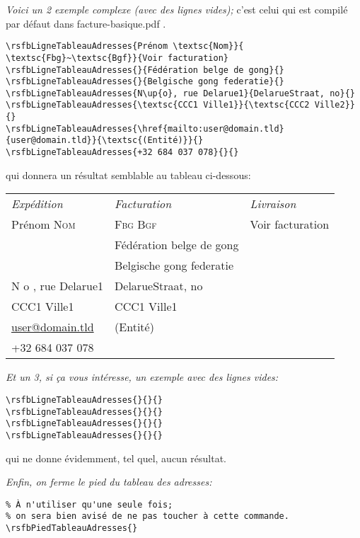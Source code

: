 \documentclass[a4paper,10pt]{article}
\begin{document}
\emph{Voici un 2 exemple complexe (avec des lignes vides);} c'est celui qui est compilé par défaut dans \og facture-basique.pdf \fg.
\begin{lstlisting}
\rsfbLigneTableauAdresses{Prénom \textsc{Nom}}{ \textsc{Fbg}~\textsc{Bgf}}{Voir facturation}
\rsfbLigneTableauAdresses{}{Fédération belge de gong}{}
\rsfbLigneTableauAdresses{}{Belgische gong federatie}{}
\rsfbLigneTableauAdresses{N\up{o}, rue Delarue1}{DelarueStraat, no}{}
\rsfbLigneTableauAdresses{\textsc{CCC1 Ville1}}{\textsc{CCC2 Ville2}}{}
\rsfbLigneTableauAdresses{\href{mailto:user@domain.tld}{user@domain.tld}}{\textsc{(Entité)}}{}
\rsfbLigneTableauAdresses{+32 684 037 078}{}{}
\end{lstlisting}

qui donnera un résultat semblable au tableau ci-dessous:
\begin{flushleft}
\begin{tabular}{p{}p{}p{}}
\hline
 \emph{Expédition} & \emph{Facturation} & \emph{Livraison} \\
 Prénom \textsc{Nom} & \textsc{Fbg Bgf} & Voir facturation \\
  & Fédération belge de gong &  \\
  & Belgische gong federatie &  \\
 N o , rue Delarue1 & DelarueStraat, no &  \\
 CCC1 Ville1 & CCC1 Ville1 &  \\
 \href{mailto:user@domain.tld}{user@domain.tld} & (Entité) &  \\
 +32 684 037 078 &  &  \\ 
\hline
\end{tabular}
\end{flushleft}


\emph{Et un 3, si ça vous intéresse, un exemple avec des lignes vides:}
\begin{lstlisting}
\rsfbLigneTableauAdresses{}{}{}
\rsfbLigneTableauAdresses{}{}{}
\rsfbLigneTableauAdresses{}{}{}
\rsfbLigneTableauAdresses{}{}{}
\end{lstlisting}
qui ne donne évidemment, tel quel, aucun résultat.


\emph{Enfin, on ferme le pied du tableau des adresses:}
\begin{lstlisting}
% À n'utiliser qu'une seule fois; 
% on sera bien avisé de ne pas toucher à cette commande.
\rsfbPiedTableauAdresses{}
\end{lstlisting}
\end{document}

